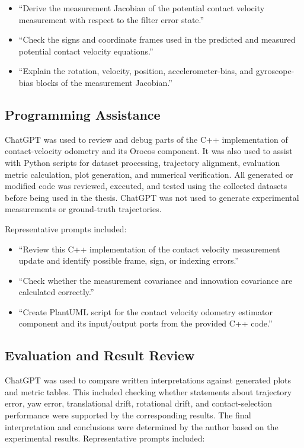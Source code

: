 \documentclass[report.tex]{subfiles}
\begin{document}
\begin{itemize}
    \item ``Derive the measurement Jacobian of the potential contact velocity measurement with respect to the filter error state.''
    \item ``Check the signs and coordinate frames used in the predicted and measured potential contact velocity equations.''
    \item ``Explain the rotation, velocity, position, accelerometer-bias, and gyroscope-bias blocks of the measurement Jacobian.''
\end{itemize}

\subsection{Programming Assistance}

ChatGPT was used to review and debug parts of the C++ implementation of contact-velocity odometry and its Orocos component. It was also used to assist with Python scripts for dataset processing, trajectory alignment, evaluation metric calculation, plot generation, and numerical verification. All generated or modified code was reviewed, executed, and tested using the collected datasets before being used in the thesis. ChatGPT was not used to generate experimental measurements or ground-truth trajectories.

Representative prompts included:

\begin{itemize}
    \item ``Review this C++ implementation of the contact velocity measurement update and identify possible frame, sign, or indexing errors.''
    \item ``Check whether the measurement covariance and innovation covariance are calculated correctly.''
    \item ``Create PlantUML script for the contact velocity odometry estimator component and its input/output ports from the provided C++ code.''
\end{itemize}

\subsection{Evaluation and Result Review}

ChatGPT was used to compare written interpretations against generated plots and metric tables. This included checking whether statements about trajectory error, yaw error, translational drift, rotational drift, and contact-selection performance were supported by the corresponding results. The final interpretation and conclusions were determined by the author based on the experimental results.
Representative prompts included:
\end{document}
